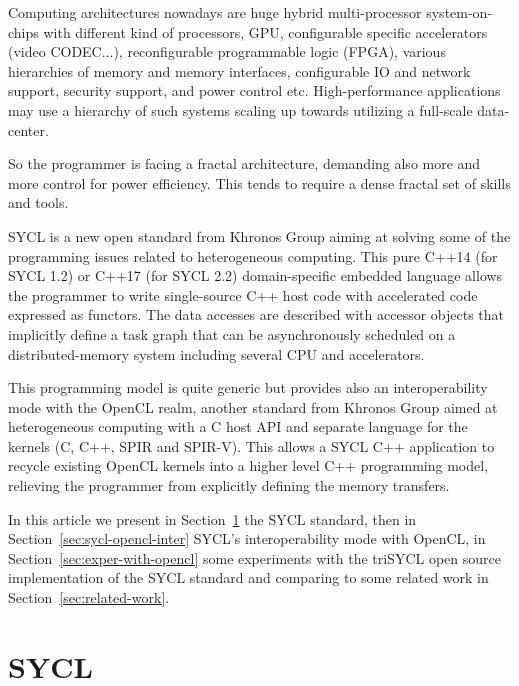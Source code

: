 \documentclass[sigplan]{acmart}
\begin{document}
Computing architectures nowadays are huge hybrid multi-processor
system-on-chips with different kind of processors, GPU, configurable
specific accelerators (video CODEC...), reconfigurable programmable
logic (FPGA), various hierarchies of memory and memory interfaces,
configurable IO and network support, security support, and power control
etc. High-performance applications may use a hierarchy of such systems
scaling up towards utilizing a full-scale data-center.

So the programmer is facing a fractal architecture, demanding
also more and more control for power efficiency. This tends to require
a dense fractal set of skills and tools.

SYCL \cite{SYCL-1.2,SYCL-2.2-provisional} is a new open standard from Khronos
Group aiming at solving some of the programming issues related to
heterogeneous computing.  This pure C++14 (for SYCL 1.2) or C++17 (for
SYCL 2.2) domain-specific embedded
language allows the programmer to write single-source C++ host code
with accelerated code expressed as functors. The data accesses are
described with accessor objects that implicitly define a task graph
that can be asynchronously scheduled on a distributed-memory system
including several CPU and accelerators.

This programming model is quite generic but provides also an
interoperability mode with the OpenCL realm, another standard from
Khronos Group aimed at heterogeneous computing with a C host API and
separate language for the kernels (C, C++, SPIR and SPIR-V).  This
allows a SYCL C++ application to recycle existing OpenCL kernels into
a higher level C++ programming model, relieving the programmer from
explicitly defining the memory transfers.

In this article we present in Section~\ref{sec:sycl} the SYCL
standard, then in Section~\ref{sec:sycl-opencl-inter} SYCL's interoperability mode with OpenCL, in
Section~\ref{sec:exper-with-opencl} some experiments with the
triSYCL open source implementation of the SYCL standard and comparing
to some related work in Section~\ref{sec:related-work}.


\section{SYCL}
\label{sec:sycl}
\end{document}
